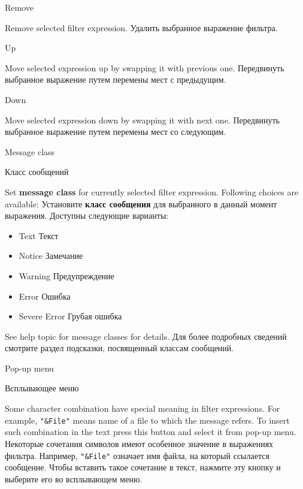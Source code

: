 \begin{popup}
\caption{Remove}

\ifenglish
Remove selected filter expression.
\else
Удалить выбранное выражение фильтра. 
\fi
\end{popup}

\begin{popup}
\caption{Up}

\ifenglish
Move selected expression up by swapping it with previous one.
\else
Передвинуть выбранное выражение путем перемены мест с предыдущим.
\fi
\end{popup}

\begin{popup}
\caption{Down}

\ifenglish
Move selected expression down by swapping it with next one.
\else
Передвинуть выбранное выражение путем перемены мест со следующим.
\fi
\end{popup}

\begin{popup}
\ifenglish
\caption{Message class}
\else
\caption{Класс сообщений}
\fi
{}

\ifenglish
Set {\bf message class} for currently selected filter expression. Following choices
are available:
\else
Установите {\bf класс сообщения} для выбранного в данный момент выражения. Доступны
следующие варианты:
\fi
\begin{itemize}
\item \ifenglish
      Text
      \else
      Текст
      \fi
\item \ifenglish
      Notice
      \else
      Замечание
      \fi
\item \ifenglish
      Warning
      \else
      Предупреждение
      \fi
\item \ifenglish
      Error
      \else
      Ошибка
      \fi
\item \ifenglish
      Severe Error
      \else
      Грубая ошибка 
      \fi
\end{itemize}

\ifenglish
See help topic for message classes for details.
\else
Для более подробных сведений смотрите раздел подсказки, посвященный 
классам сообщений.
\fi
\end{popup}

\begin{popup}
\ifenglish
\caption{Pop-up menu}
\else
\caption{Всплывающее меню}
\fi
{}

\ifenglish
Some character combination have special meaning in filter expressions.
For example, {\tt"\&File"} means name of a file to which the message refers.
To insert such combination in the text press this button and select it
from pop-up menu.
\else
Некоторые сочетания символов имеют особенное значение в выражениях фильтра.
Например, {\tt"\&File"} означает имя файла, на который ссылается сообщение.
Чтобы вставить такое сочетание в текст, нажмите эту кнопку и выберите его
во всплывающем меню.
\fi
\end{popup}


